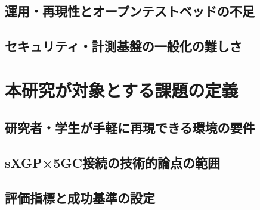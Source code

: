 \subsection{運用・再現性とオープンテストベッドの不足}
\subsection{セキュリティ・計測基盤の一般化の難しさ}

\section{本研究が対象とする課題の定義}
\subsection{研究者・学生が手軽に再現できる環境の要件}
\subsection{sXGP×5GC接続の技術的論点の範囲}
\subsection{評価指標と成功基準の設定}











